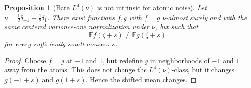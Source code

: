 \documentclass[10pt,a4paper]{amsart}
\newtheorem{proposition}[theorem]{Proposition}
\newcommand{\E}{\mathbb E}
\begin{document}
\begin{proposition}[Bare \(L^4(\nu)\) is not intrinsic for atomic noise]
Let \(\nu=\frac12\delta_{-1}+\frac12\delta_1\).  There exist functions \(f,g\) with \(f=g\) \(\nu\)-almost surely and with the same centered variance-one normalization under \(\nu\), but such that
\[
        \E f(\zeta+s)\ne \E g(\zeta+s)
\]
for every sufficiently small nonzero \(s\).
\end{proposition}

\begin{proof}
Choose \(f=g\) at \(-1\) and \(1\), but redefine \(g\) in neighborhoods of \(-1\) and \(1\) away from the atoms.  This does not change the \(L^4(\nu)\)-class, but it changes \(g(-1+s)\) and \(g(1+s)\).  Hence the shifted mean changes.
\end{proof}
\end{document}
